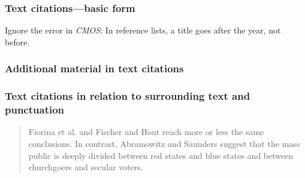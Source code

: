 \documentclass[11pt,letterpaper,oneside]{article}
\begin{document}
\begin{citeref}
\item \parencite[218]{fogel2004b}
\item \parencite[45--46]{fogel2004a}
\end{citeref}

\setcounter{subsubsection}{21}
\subsubsection{Text citations---basic form}
\label{15.22}

Ignore the error in \textit{CMOS}: In reference lists, a title goes
after the year, not before.

\begin{citeref}
\item \parencite{hetherington2015}
\item \parencite{grove2015}
\item \parencite{hetherington2015,grove2015}
\end{citeref}

\begin{citeref}
\item \parencite{doershuk2017}
\item \parencite{doershuk2016}
\end{citeref}

\setcounter{subsubsection}{23}
\subsubsection{Additional material in text citations}

\begin{citeref}
\item \parencite[; t-tests are used here]{mandolan2017}
\end{citeref}

\subsubsection{Text citations in relation to surrounding text and punctuation}
\label{15.25}

\begin{quote} Fiorina et al. \parencite*{fiorina2005} and Fischer and
Hout \parencite*{fischer2006} reach more or less the same conclusions.
In contrast, Abramowitz and Saunders \parencite*{abramowitz2005}
suggest that the mass public is deeply divided between red states and
blue states and between churchgoers and secular voters. \end{quote}
\end{document}
